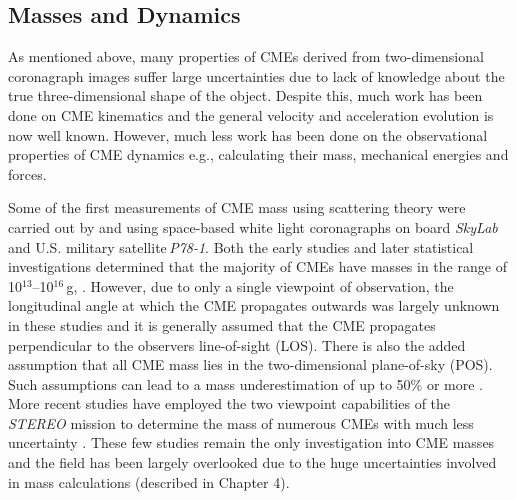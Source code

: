\subsection{Masses and Dynamics}

As mentioned above, many properties of CMEs derived from two-dimensional coronagraph images suffer large uncertainties due to lack of knowledge about the true three-dimensional shape of the object. Despite this, much work has been done on CME kinematics and the general velocity and acceleration evolution is now well known. However, much less work has been done on the observational properties of CME dynamics e.g., calculating their mass, mechanical energies and forces. 

Some of the first measurements of CME mass using scattering theory were carried out by \citet{munro1979} and \citet{poland1981} using space-based  white light coronagraphs on board \emph{SkyLab} and U.S. military satellite\,\emph{P78-1}.  Both the early studies and later statistical investigations determined that the majority of CMEs have masses in the range of 10$^{13}$--10$^{16}$\,g, \citep{vourlidas02, vour2010}. However, due to only a single viewpoint of observation, the longitudinal angle at which the CME propagates outwards was largely unknown in these studies and it is generally assumed that the CME propagates perpendicular to the observers line-of-sight (LOS). There is also the added assumption that all CME mass lies in the two-dimensional plane-of-sky (POS). Such assumptions can lead to a mass underestimation of up to 50\% or more \citep{vou00}. More recent studies have employed the two viewpoint capabilities of the \emph{STEREO} mission to determine the mass of numerous CMEs with much less uncertainty \citep{cola09}. These few studies remain the only investigation into CME masses and the field has been largely overlooked due to the huge uncertainties involved in mass calculations (described in Chapter 4).

